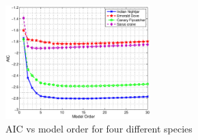 \documentclass[a4paper]{article}
\begin{document}
 
 
%

 
 \begin{figure}[!ht]
	\centering
	\includegraphics[width=0.5\textwidth,height=7 cm] {species_4.eps}
	\caption{AIC vs model order for four different species }   
	\label{fig:species_4}
\end{figure} 
 
 
 
 
%
% 
% 
 
\end{document}
